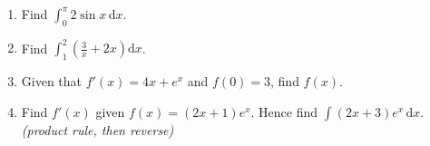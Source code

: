 \documentclass[12pt, twoside]{article}
\begin{document}
\begin{enumerate}[itemsep=0.3cm]
\item Find $\displaystyle\int_0^{\pi} 2\sin x\,\mathrm{d}x$.
\vspace{2cm}

\item Find $\displaystyle\int_1^2 \left(\frac{3}{x} + 2x\right)\mathrm{d}x$.
\vspace{2cm}

\item Given that $f'(x) = 4x + e^x$ and $f(0) = 3$, find $f(x)$.
\vspace{2cm}

\item Find $f'(x)$ given $f(x) = (2x+1)e^x$.
Hence find $\displaystyle\int (2x + 3)e^x\,\mathrm{d}x$.
\hfill \emph{(product rule, then reverse)}

\end{enumerate}
\end{document}
